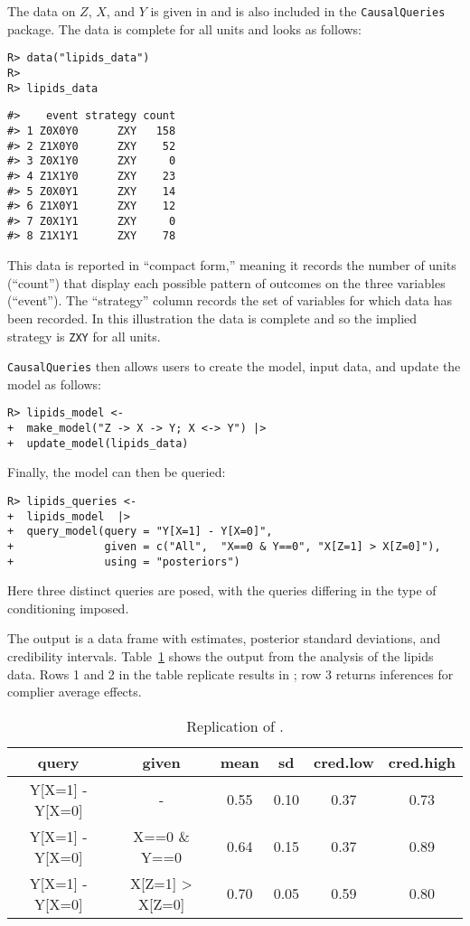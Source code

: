 \documentclass[
  11pt,
  article]{jss}
\begin{document}
The data on \(Z\), \(X\), and \(Y\) is given in
\citet{chickering_clinicians_1996} and is also included in the
\texttt{CausalQueries} package. The data is complete for all units and
looks as follows:

\begin{verbatim}
R> data("lipids_data")
R> 
R> lipids_data
\end{verbatim}

\begin{verbatim}
#>    event strategy count
#> 1 Z0X0Y0      ZXY   158
#> 2 Z1X0Y0      ZXY    52
#> 3 Z0X1Y0      ZXY     0
#> 4 Z1X1Y0      ZXY    23
#> 5 Z0X0Y1      ZXY    14
#> 6 Z1X0Y1      ZXY    12
#> 7 Z0X1Y1      ZXY     0
#> 8 Z1X1Y1      ZXY    78
\end{verbatim}

This data is reported in ``compact form,'' meaning it records the number
of units (``count'') that display each possible pattern of outcomes on
the three variables (``event''). The ``strategy'' column records the set
of variables for which data has been recorded. In this illustration the
data is complete and so the implied strategy is \texttt{ZXY} for all
units.

\texttt{CausalQueries} then allows users to create the model, input
data, and update the model as follows:

\begin{verbatim}
R> lipids_model <-  
+  make_model("Z -> X -> Y; X <-> Y") |>
+  update_model(lipids_data)
\end{verbatim}

Finally, the model can then be queried:

\begin{verbatim}
R> lipids_queries <- 
+  lipids_model  |>
+  query_model(query = "Y[X=1] - Y[X=0]",
+              given = c("All",  "X==0 & Y==0", "X[Z=1] > X[Z=0]"),
+              using = "posteriors") 
\end{verbatim}

Here three distinct queries are posed, with the queries differing in the
type of conditioning imposed.

The output is a data frame with estimates, posterior standard
deviations, and credibility intervals. Table~\ref{tbl-lipids} shows the
output from the analysis of the lipids data. Rows 1 and 2 in the table
replicate results in \citet{chickering_clinicians_1996}; row 3 returns
inferences for complier average effects.

\begin{longtable}[t]{cccccc}

\caption{\label{tbl-lipids}Replication of
\citet{chickering_clinicians_1996}.}

\tabularnewline

\toprule
query & given & mean & sd & cred.low & cred.high\\
\midrule
Y[X=1] - Y[X=0] & - & 0.55 & 0.10 & 0.37 & 0.73\\
Y[X=1] - Y[X=0] & X==0 \& Y==0 & 0.64 & 0.15 & 0.37 & 0.89\\
Y[X=1] - Y[X=0] & X[Z=1] > X[Z=0] & 0.70 & 0.05 & 0.59 & 0.80\\
\bottomrule

\end{longtable}
\end{document}
